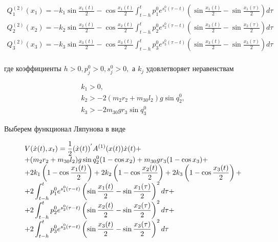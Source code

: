  \begin{equation}
  \begin{array}{l}
  \displaystyle Q_1^{(2)} (x_1) = -k_1 \sin \frac{x_1(t)}{2} - \cos \frac{x_1(t)}{2} \int_{t - h}^{t} p_1^0 e^{s_1^0 (\tau - t)} \left( \sin \frac{x_1(t)}{2} - \sin \frac{x_1(\tau)}{2} \right) d \tau \\
  \displaystyle Q_2^{(2)} (x_2) = -k_2 \sin \frac{x_2(t)}{2} - \cos \frac{x_2(t)}{2} \int_{t - h}^{t} p_2^0 e^{s_2^0 (\tau - t)} \left( \sin \frac{x_2(t)}{2} - \sin \frac{x_2(\tau)}{2} \right) d \tau \\
  \displaystyle Q_3^{(2)} (x_3) = -k_3 \sin \frac{x_3(t)}{2} - \cos \frac{x_3(t)}{2} \int_{t - h}^{t} p_3^0 e^{s_3^0 (\tau - t)} \left( \sin \frac{x_3(t)}{2} - \sin \frac{x_3(\tau)}{2} \right) d \tau \\ \label{chain3_control_int}
  \end{array}
  \end{equation}
  
  где коэффициенты $h > 0, p_j^0 > 0, s_j^0 > 0,$ а $k_j$ удовлетворяет неравенствам
  
  \begin{equation*}
  \begin{array}{l}
  k_1 > 0, \\
  k_2 > - 2 (m_2 r_2 + m_{30} l_2) g \sin q_2^0, \\
  k_3 > - 2 m_{30} g r_3 \sin q_3^0
  \end{array}
  \end{equation*}
  
  Выберем функционал Ляпунова в виде
  
  \begin{equation*}
  \begin{array}{l}
   \displaystyle V(\dot x(t), x_t) = \frac12 (\dot x(t))^{'} A^{(1)} (x(t)) \dot x(t) + \\
   \displaystyle +(m_2 r_2 + m_{30} l_2) g \sin q_2^0 (1 - \cos x_2) + m_{30} g r_3 (1 - \cos x_3) + \\ 
   \displaystyle + 2 k_1 \left(1 - \cos \frac{x_1(t)}{2} \right) + 2 k_2 \left(1 - \cos \frac{x_2(t)}{2} \right) + 2 k_3 \left(1 - \cos \frac{x_3(t)}{2} \right) + \\ 
   \displaystyle + 2 \int_{t - h}^{t} p_1^0 e^{s_1^0 (\tau - t)} \left( \sin \frac{x_1(t)}{2} - \sin \displaystyle \displaystyle \frac{x_1(\tau)}{2} \right)^2 d \tau + \\ 
   \displaystyle + 2\int_{t - h}^{t} p_2^0 e^{s_2^0 (\tau - t)} \left( \sin \frac{x_2(t)}{2} - \sin \frac{x_2(\tau)}{2} \right)^2 d \tau + \\ 
   \displaystyle + 2 \int_{t - h}^{t} p_3^0 e^{s_3^0 (\tau - t)} \left( \sin \frac{x_3(t)}{2} - \sin \frac{x_3(\tau)}{2} \right)^2 d \tau
  \end{array}
  \end{equation*}
  
